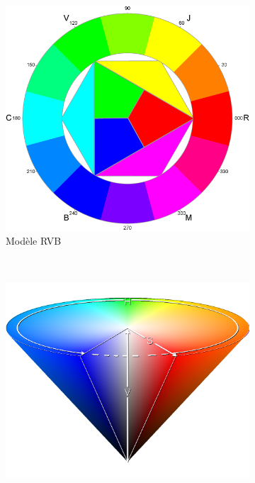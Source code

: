 \begin{itemize}
					\begin{figure}[H]
						\centering
						\begin{subfigure}[h]{0.35\textwidth}
					        \includegraphics[width=\textwidth]{Graphics/RVB.png}
					        \caption{Modèle RVB}
					    \end{subfigure}
					    ~
					    \begin{subfigure}[h]{0.35\textwidth}
					        \includegraphics[width=\textwidth]{Graphics/HSV_cone.png}

\end{subfigure}
\end{figure}
\end{itemize}
